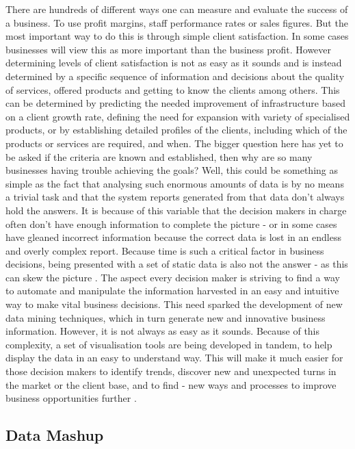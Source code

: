 There are hundreds of different ways one can measure and evaluate the success of a business. To use profit margins, staff performance rates or sales figures. But the most important way to do this is through simple client satisfaction. In some cases businesses will view this as more important than the business profit. However determining levels of client satisfaction is not as easy as it sounds and is instead determined by a specific sequence of information and decisions about the quality of services, offered products and getting to know the clients among others. This can be determined by predicting the needed improvement of infrastructure based on a client growth rate, defining the need for expansion with variety of specialised products, or by establishing detailed profiles of the clients, including which of the products or services are required, and when. The bigger question here has yet to be asked if the criteria are known and established, then why are so many businesses having trouble achieving the goals? Well, this could be something as simple as the fact that analysing such enormous amounts of data is by no means a trivial task and that the system reports generated from that data don't always hold the answers. It is because of this variable that the decision makers in charge often don't have enough information to complete the picture - or in some cases have gleaned incorrect information because the correct data is lost in an endless and overly complex report. Because time is such a critical factor in business decisions, being presented with a set of static data is also not the answer - as this can skew the picture \cite{bertsimas2014introduction}. The aspect every decision maker is striving to find a way to automate and manipulate the information harvested in an easy and intuitive way to make vital business decisions. This need sparked the development of new data mining techniques, which in turn generate new and innovative business information. However, it is not always as easy as it sounds. Because of this complexity, a set of visualisation tools are being developed in tandem, to help display the data in an easy to understand way. This will make it much easier for those decision makers to identify trends, discover new and unexpected turns in the market or the client base, and to find - new ways and processes to improve business opportunities further \cite{albright2014business}. 

\subsection{Data Mashup}


